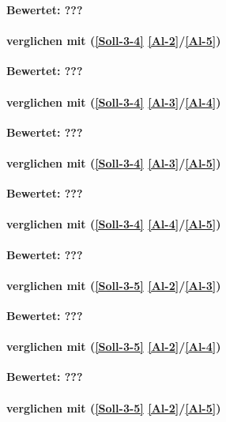 \textbf{Bewertet: ???}

\paragraph*{  verglichen mit  (\ref{Soll-3-4} \ref{Al-2}/\ref{Al-5})}

\textbf{Bewertet: ???}

\paragraph*{  verglichen mit  (\ref{Soll-3-4} \ref{Al-3}/\ref{Al-4})}

\textbf{Bewertet: ???}

\paragraph*{  verglichen mit  (\ref{Soll-3-4} \ref{Al-3}/\ref{Al-5})}

\textbf{Bewertet: ???}


\paragraph*{  verglichen mit  (\ref{Soll-3-4} \ref{Al-4}/\ref{Al-5})}

\textbf{Bewertet: ???}


\paragraph*{  verglichen mit  (\ref{Soll-3-5} \ref{Al-2}/\ref{Al-3})}

\textbf{Bewertet: ???}

\paragraph*{  verglichen mit  (\ref{Soll-3-5} \ref{Al-2}/\ref{Al-4})}

\textbf{Bewertet: ???}

\paragraph*{  verglichen mit  (\ref{Soll-3-5} \ref{Al-2}/\ref{Al-5})}

